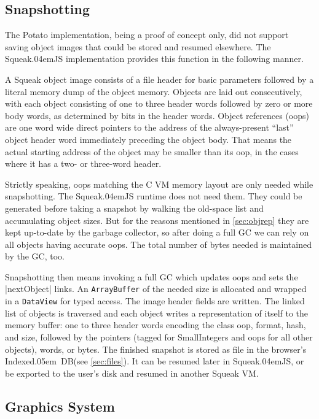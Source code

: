 \documentclass[natbib]{sigplanconf}
\newcommand*\SqueakJS{Squeak\texorpdfstring{\kern.04em}{}JS\xspace}
\newcommand*\IndexedDB{\mbox{Indexed\kern.05em DB}\xspace}
\begin{document}
\subsection{Snapshotting}

The Potato implementation, being a proof of concept only, did not support
saving object images that could be stored and resumed elsewhere. The \SqueakJS
implementation provides this function in the following manner.

A Squeak object image consists of a file header for basic parameters
followed by a literal memory dump of the object memory. Objects are
laid out consecutively, with each object consisting of one to three
header words followed by zero or more body words, as determined by
bits in the header words. Object references (oops) are one word wide
direct pointers to the address of the always-present ``last'' object
header word immediately preceding the object body. That means the
actual starting address of the object may be smaller than its oop, in
the cases where it has a two- or three-word header.

Strictly speaking, oops matching the C \ac{VM} memory layout are only
needed while snapshotting. The \SqueakJS runtime does not need them.
They could be generated before taking a snapshot by walking the
old-space list and accumulating object sizes. But for the reasons
mentioned in \autoref{sec:objrep} they are kept up-to-date by the
garbage collector, so after doing a full \ac{GC} we can rely on all
objects having accurate oops. The total number of bytes needed is
maintained by the \ac{GC}, too.

Snapshotting then means invoking a full \ac{GC} which updates oops and
sets the |nextObject| links. An \lstinline|ArrayBuffer| of the needed
size is allocated and wrapped in a \lstinline|DataView| for typed
access. The image header fields are written. The linked list of
objects is traversed and each object writes a representation of itself
to the memory buffer: one to three header words encoding the class
oop, format, hash, and size, followed by the pointers (tagged for
SmallIntegers and oops for all other objects), words, or bytes. The
finished snapshot is stored as file in the browser's
\IndexedDB  (see \autoref{sec:files}). It can be
resumed later in \SqueakJS, or be exported to the user's disk and
resumed in another Squeak \ac{VM}.

\subsection{Graphics System}
\end{document}
